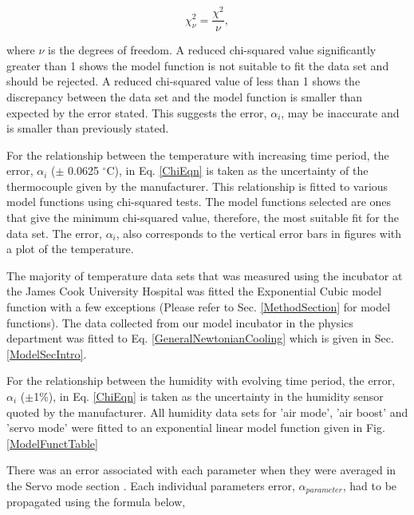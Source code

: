 \documentclass{article}
\begin{document}
\begin{equation}\label{ReducedChiEqn}
\chi_{\nu}^{2} = \frac{\chi^{2}}{\nu},
\end{equation}

where $\nu$ is the degrees of freedom. A reduced chi-squared value significantly greater than 1 shows the model function is not suitable to fit the data set and should be rejected. A reduced chi-squared value of less than 1 shows the discrepancy between the data set and the model function is smaller than expected by the error stated. This suggests the error, $\alpha_{i}$, may be inaccurate and is smaller than previously stated.

\vspace{3mm}

For the relationship between the temperature with increasing time period, the error, $\alpha_{i}$ ($\pm$ 0.0625 $^{\circ}$C), in Eq. \ref{ChiEqn} is taken as the uncertainty of the thermocouple given by the manufacturer. This relationship is fitted to various model functions using chi-squared tests. The model functions selected are ones that give the minimum chi-squared value, therefore, the most suitable fit for the data set. The error, $\alpha_{i}$, also corresponds to the vertical error bars in figures with a plot of the temperature.

\vspace{3mm}

The majority of temperature data sets that was measured using the incubator at the James Cook University Hospital was fitted the Exponential Cubic model function with a few exceptions (Please refer to Sec. \ref{MethodSection} for model functions). The data collected from our model incubator in the physics department was fitted to Eq. \ref{GeneralNewtonianCooling} which is given in Sec. \ref{ModelSecIntro}.

\vspace{3mm}

For the relationship between the humidity with evolving time period, the error, $\alpha_{i}$ ($\pm$1\%), in Eq. \ref{ChiEqn} is taken as the uncertainty in the humidity sensor quoted by the manufacturer. All humidity data sets for 'air mode', 'air boost' and 'servo mode' were fitted to an exponential linear model function given in Fig. \ref{ModelFunctTable}

\vspace{3mm}

There was an error associated with each parameter when they were averaged in the Servo mode section \cite{LS2}. Each individual parameters error, $\alpha_{parameter}$, had to be propagated using the formula below,
\end{document}
